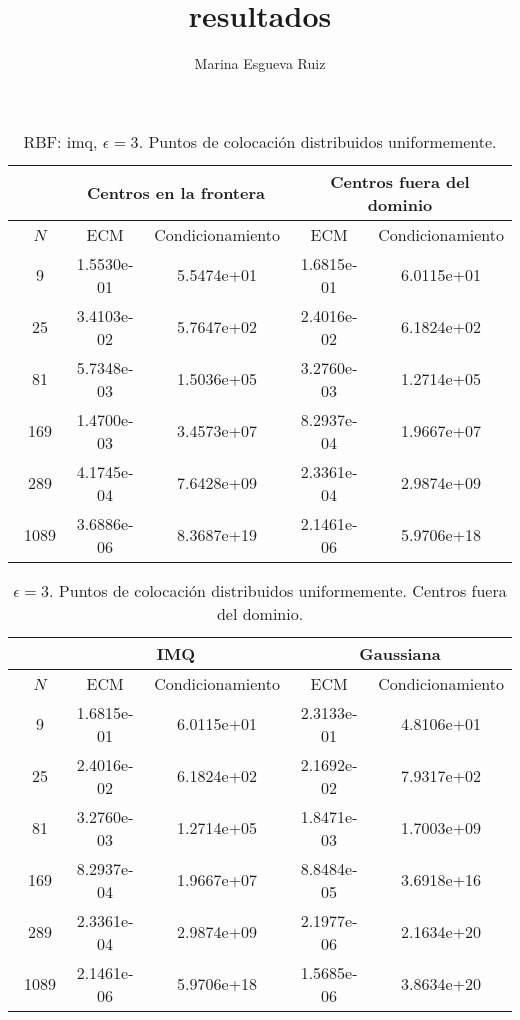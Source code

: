 \documentclass[11pt,a4paper]{article}
\author{Marina Esgueva Ruiz}
\title{resultados}
\begin{document}
\begin{table}[H]
\begin{center}
\caption{RBF: imq, $\epsilon=3$. Puntos de colocación distribuidos uniformemente.}
\begin{tabular}{|c|cc|cc|}
\hline
\ & \multicolumn{2}{|c|}{Centros en la frontera} & \multicolumn{2}{|c|}{Centros fuera del dominio} \\
\hline
\ $N$& ECM & Condicionamiento & ECM & Condicionamiento \\
\hline
\ 9 & 1.5530e-01 & 5.5474e+01& 1.6815e-01 & 6.0115e+01 \\
\ 25 &  3.4103e-02& 5.7647e+02 & 2.4016e-02 &6.1824e+02  \\
\ 81 & 5.7348e-03 & 1.5036e+05&  3.2760e-03 & 1.2714e+05 \\
\ 169 & 1.4700e-03 &3.4573e+07  & 8.2937e-04&1.9667e+07  \\
\ 289 &4.1745e-04  & 7.6428e+09&  2.3361e-04&2.9874e+09  \\
\ 1089 & 3.6886e-06 & 8.3687e+19 &   2.1461e-06 &5.9706e+18  \\
\hline
\end{tabular}
\end{center}
\end{table}

\begin{table}[H]
\begin{center}
\caption{ $\epsilon=3$. Puntos de colocación distribuidos uniformemente. Centros fuera del dominio.}
\begin{tabular}{|c|cc|cc|}
\hline
\ & \multicolumn{2}{|c|}{IMQ} & \multicolumn{2}{|c|}{Gaussiana} \\
\hline
\ $N$& ECM & Condicionamiento & ECM & Condicionamiento \\
\hline
\ 9 &   1.6815e-01 & 6.0115e+01 &2.3133e-01&4.8106e+01\\
\ 25 &   2.4016e-02 &6.1824e+02 & 2.1692e-02&7.9317e+02 \\
\ 81 &   3.2760e-03 & 1.2714e+05&1.8471e-03&1.7003e+09 \\
\ 169 &  8.2937e-04&1.9667e+07&8.8484e-05&3.6918e+16  \\
\ 289 &  2.3361e-04&2.9874e+09 &2.1977e-06&2.1634e+20 \\
\ 1089 & 2.1461e-06 &5.9706e+18&1.5685e-06&  3.8634e+20\\
\hline
\end{tabular}
\end{center}
\end{table}
\end{document}
